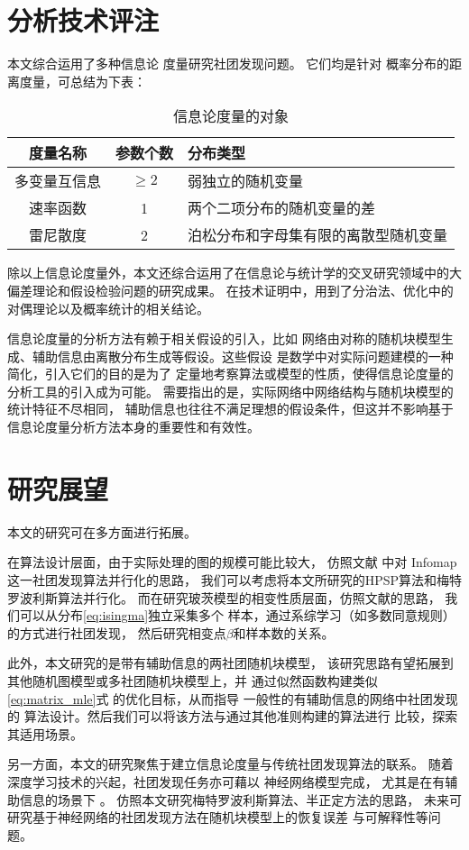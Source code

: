 \section{分析技术评注}
本文综合运用了多种信息论
度量研究社团发现问题。
它们均是针对
概率分布的距离度量，可总结为下表：
\begin{table}[!ht]
    \centering
  \begin{tabular}{ccp{8cm}}
    \hline
     度量名称    &   参数个数 &   分布类型 \\
    \hline
     多变量互信息 &    $\geq 2$ &    弱独立的随机变量  \\
     速率函数     &    1 &     两个二项分布的随机变量的差  \\
     雷尼散度     &    2 &    泊松分布和字母集有限的离散型随机变量 \\
    \hline
  \end{tabular}
  \caption{信息论度量的对象}\label{tab:info_metric}
\end{table}

除以上信息论度量外，本文还综合运用了在信息论与统计学的交叉研究领域中的大偏差理论和假设检验问题的研究成果。
在技术证明中，用到了分治法、优化中的对偶理论以及概率统计的相关结论。

信息论度量的分析方法有赖于相关假设的引入，比如
网络由对称的随机块模型生成、辅助信息由离散分布生成等假设。这些假设
是数学中对实际问题建模的一种简化，引入它们的目的是为了
定量地考察算法或模型的性质，使得信息论度量的分析工具的引入成为可能。
需要指出的是，实际网络中网络结构与随机块模型的统计特征不尽相同，
辅助信息也往往不满足理想的假设条件，但这并不影响基于信息论度量分析方法本身的重要性和有效性。

\section{研究展望}
本文的研究可在多方面进行拓展。

在算法设计层面，由于实际处理的图的规模可能比较大，
仿照文献  中对 Infomap 这一社团发现算法并行化的思路，
我们可以考虑将本文所研究的HPSP算法和梅特罗波利斯算法并行化。
而在研究玻茨模型的相变性质层面，仿照文献的思路，
我们可以从分布\eqref{eq:isingma}独立采集多个
样本，通过系综学习（如多数同意规则）的方式进行社团发现，
然后研究相变点$\beta$和样本数的关系。

此外，本文研究的是带有辅助信息的两社团随机块模型，
该研究思路有望拓展到其他随机图模型或多社团随机块模型上，并
通过似然函数构建类似\eqref{eq:matrix_mle}式
的优化目标，从而指导
一般性的有辅助信息的网络中社团发现的
算法设计。然后我们可以将该方法与通过其他准则\cite{chunaev2020community}构建的算法进行
比较，探索其适用场景。

另一方面，本文的研究聚焦于建立信息论度量与传统社团发现算法的联系。
随着深度学习技术的兴起，社团发现任务亦可藉以
神经网络模型完成\cite{Su_2022}，
尤其是在有辅助信息的场景下 \cite{cao2018incorporating}。
仿照本文研究梅特罗波利斯算法、半正定方法的思路，
未来可研究基于神经网络的社团发现方法在随机块模型上的恢复误差
与可解释性等问题。
